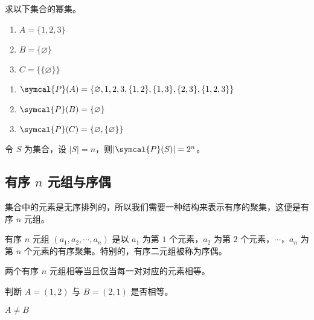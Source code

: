 \documentclass[lang=cn, chinesefont=founder, math=cm, color=cyan, citestyle=gb7714-2015, bibstyle=gb7714-2015]{elegantbook}
\begin{document}
\begin{collections}
    \begin{example}
        求以下集合的幂集。
        \begin{enumerate}
            \item $A = \{1, 2, 3\}$
            \item $B = \{ \varnothing \}$
            \item $C = \{\{ \varnothing \}\}$
        \end{enumerate}
    \end{example}
    \begin{solution}
        \begin{enumerate}
            \item $\symcal{P}(A) = \{\varnothing, 1, 2, 3, \{1, 2\}, \{1, 3\}, \{2, 3\}, \{1, 2, 3\}\}$
            \item $\symcal{P}(B) = \{\varnothing\}$
            \item $\symcal{P}(C) = \{\varnothing, \{\varnothing\}\}$
        \end{enumerate}
    \end{solution}
\end{collections}

\begin{theorem}
    令 $S$ 为集合，设 $|S| = n$，则$|\symcal{P}(S)| = 2^n$。
\end{theorem}

\subsection{有序 $n$ 元组与序偶}
集合中的元素是无序排列的，所以我们需要一种结构来表示有序的聚集，这便是有序 $n$ 元组。
\begin{definition}[有序 $n$ 元组与序偶]\label{def:有序n元组与序偶}
    有序 $n$ 元组 $(a_1, a_2, \cdots, a_n)$ 是以 $a_1$ 为第 $1$ 个元素，$a_2$ 为第 $2$ 个元素，$\cdots$，$a_n$ 为第 $n$ 个元素的有序聚集。特别的，有序二元组被称为序偶。
\end{definition}

两个有序 $n$ 元组相等当且仅当每一对对应的元素相等。
\begin{collections}
    \begin{example}
        判断 $A=(1, 2)$ 与 $B=(2, 1)$ 是否相等。
    \end{example}
    \begin{solution}
        $A \neq B$
    \end{solution}
\end{collections}
\end{document}
